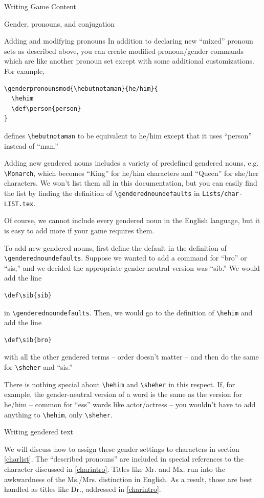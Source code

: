 \documentclass[sheet]{GameTexBase}
\begin{document}
\begin{section}{Writing Game Content}
\begin{subsection}{Gender, pronouns, and conjugation}
\begin{subsubsection}{Adding and modifying pronouns}
In addition to declaring new ``mixed'' pronoun sets as described above, you can create modified pronoun/gender commands which are like another pronoun set except with some additional customizations.  For example,
\begin{verbatim}
\genderpronounsmod{\hebutnotaman}{he/him}{
  \hehim
  \def\person{person}
}
\end{verbatim}
defines \lstinline|\hebutnotaman| to be equivalent to he/him except that it uses ``person'' instead of ``man.''
\end{subsubsection}
\begin{subsubsection}{Adding new gendered nouns}
\lrstex{} includes a variety of predefined gendered nouns, e.g. \lstinline|\Monarch|, which becomes ``King'' for he/him characters and ``Queen'' for she/her characters.  We won't list them all in this documentation, but you can easily find the list by finding the definition of \lstinline|\genderednoundefaults| in \lstinline|Lists/char-LIST.tex|.

Of course, we cannot include every gendered noun in the English language, but it is easy to add more if your game requires them.

To add new gendered nouns, first define the default in the definition of \lstinline|\genderednoundefaults|.  Suppose we wanted to add a command for ``bro'' or ``sis,'' and we decided the appropriate gender-neutral version was ``sib.''
We would add the line
\begin{verbatim}
\def\sib{sib}
\end{verbatim}
in \lstinline|\genderednoundefaults|.  Then, we would go to the definition of \lstinline|\hehim| and add the line
\begin{verbatim}
\def\sib{bro}
\end{verbatim}
with all the other gendered terms -- order doesn't matter -- and then do the same for \lstinline|\sheher| and ``sis.''

There is nothing special about \lstinline|\hehim| and \lstinline|\sheher| in this respect.  If, for example, the gender-neutral version of a word is the same as the version for he/him -- common for ``ess'' words like actor/actress -- you wouldn't have to add anything to \lstinline|\hehim|, only \lstinline|\sheher|.
\end{subsubsection}
\begin{subsubsection}{Writing gendered text}

We will discuss how to assign these gender settings to characters in section \ref{charlist}.  The ``described pronouns'' are included in special references to the character discussed in \ref{charintro}.
Titles like Mr. and Mx. run into the awkwardness of the Ms./Mrs. distinction in English.  As a result, those are best handled as titles like Dr., addressed in \ref{charintro}.


\end{subsubsection}
\end{subsection}
\end{section}
\end{document}
